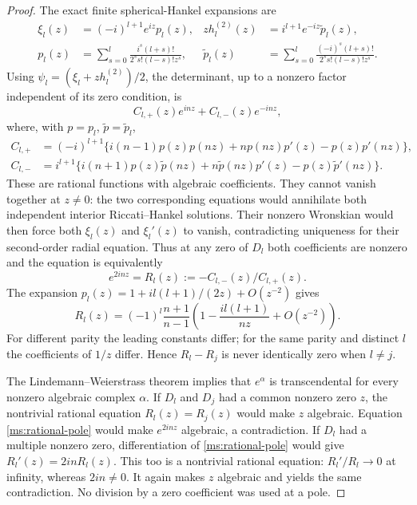 \begin{proof}
The exact finite spherical-Hankel expansions\cite{dlmfExplicit} are
\begin{align}
 \xi_l(z)&=(-i)^{l+1}e^{iz}p_l(z),&
 z h_l^{(2)}(z)&=i^{l+1}e^{-iz}\widetilde p_l(z),\\
 p_l(z)&=\sum_{s=0}^l\frac{i^s(l+s)!}{2^s s!(l-s)!z^s},&
 \widetilde p_l(z)&=\sum_{s=0}^l\frac{(-i)^s(l+s)!}{2^s s!(l-s)!z^s}.
 \label{ms:hankel-polynomials}
\end{align}
Using $\psi_l=(\xi_l+zh_l^{(2)})/2$, the determinant, up to a
nonzero factor independent of its zero condition, is
\begin{equation}
 C_{l,+}(z)e^{inz}+C_{l,-}(z)e^{-inz},
 \label{ms:exp-polynomial}
\end{equation}
where, with $p=p_l$, $\widetilde p=\widetilde p_l$,
\begin{align}
 C_{l,+}&=(-i)^{l+1}\{i(n-1)p(z)p(nz)
                  +np(nz)p'(z)-p(z)p'(nz)\},\\
 C_{l,-}&=i^{l+1}\{i(n+1)p(z)\widetilde p(nz)
             +n\widetilde p(nz)p'(z)-p(z)\widetilde p'(nz)\}.
 \label{ms:rational-coefficients}
\end{align}
These are rational functions with algebraic coefficients.  They
cannot vanish together at $z\ne0$: the two corresponding equations
would annihilate both independent interior Riccati--Hankel
solutions.  Their nonzero Wronskian would then force both
$\xi_l(z)$ and $\xi_l'(z)$ to vanish, contradicting uniqueness
for their second-order radial equation.  Thus at any zero of $D_l$
both coefficients are nonzero and the equation is equivalently
\begin{equation}
 e^{2inz}=R_l(z):=-C_{l,-}(z)/C_{l,+}(z).
 \label{ms:rational-pole}
\end{equation}
The expansion $p_l(z)=1+i l(l+1)/(2z)+O(z^{-2})$ gives
\begin{equation}
 R_l(z)=(-1)^l\frac{n+1}{n-1}
       \left(1-\frac{i l(l+1)}{nz}+O(z^{-2})\right).
 \label{ms:rational-asymptotic}
\end{equation}
For different parity the leading constants differ; for the same
parity and distinct $l$ the coefficients of $1/z$ differ.  Hence
$R_l-R_j$ is never identically zero when $l\ne j$.

The Lindemann--Weierstrass theorem implies that $e^\alpha$ is
transcendental for every nonzero algebraic complex
$\alpha$\cite{bezivinRobba1989}.  If $D_l$ and $D_j$ had a common
nonzero zero $z$, the nontrivial rational equation
$R_l(z)=R_j(z)$ would make $z$ algebraic.  Equation
\eqref{ms:rational-pole} would make $e^{2inz}$ algebraic, a
contradiction.  If $D_l$ had a multiple nonzero zero, differentiation
of \eqref{ms:rational-pole} would give
$R_l'(z)=2inR_l(z)$.  This too is a nontrivial rational equation:
$R_l'/R_l\to0$ at infinity, whereas $2in\ne0$.
It again makes $z$ algebraic and yields the same contradiction.
No division by a zero coefficient was used at a pole.


\end{proof}

